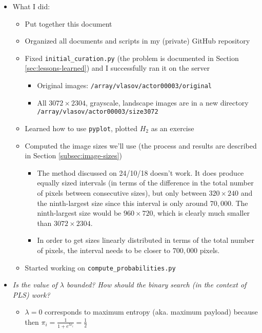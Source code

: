 \documentclass[11pt,a4paper]{report}
\begin{document}
\begin{itemize}

\item What I did:
  \begin{itemize}
  \item Put together this document
  \item Organized all documents and scripts in my (private) GitHub repository
  \item Fixed \texttt{initial\_curation.py} (the problem is documented in Section \ref{sec:lessons-learned}) and I successfully ran it on the server
    \begin{itemize}
    \item Original images: \texttt{/array/vlasov/actor00003/original}
    \item All $3072\times2304$, grayscale, landscape images are in a new directory \texttt{/array/vlasov/actor00003/size3072}
    \end{itemize}
  \item Learned how to use \texttt{pyplot}, plotted $H_2$ as an exercise
  \item Computed the image sizes we'll use (the process and results are described in Section \ref{subsec:image-sizes})
    \begin{itemize}
    \item The method discussed on 24/10/18 doesn't work. It does produce equally sized intervals (in terms of the difference in the total number of pixels between consecutive sizes), but only between $320\times240$ and the ninth-largest size since this interval is only around $70,000$. The ninth-largest size would be $960\times720$, which is clearly much smaller than $3072\times2304$.
    \item In order to get sizes linearly distributed in terms of the total number of pixels, the interval needs to be closer to $700,000$ pixels.
    \end{itemize}
  \item Started working on \texttt{compute\_probabilities.py}
  \end{itemize}

\item \textit{Is the value of $\lambda$ bounded? How should the binary search (in the context of PLS) work?}
  \begin{itemize}
  \item $\lambda = 0$ corresponds to maximum entropy (aka. maximum payload) because then $\pi_i = \frac{1}{1+e^{\lambda c_i}} = \frac{1}{2}$


\end{itemize}
\end{itemize}
\end{document}
